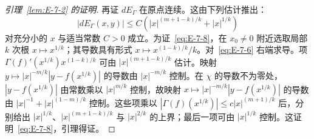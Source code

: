 \begin{proof}[引理~\ref{lem:E-7-2} 的证明]
再证 $dE_\Gamma$ 在原点连续。这由下列估计推出：
\begin{equation}\label{eq:E-7-8}
  |dE_\Gamma(x,y)|\le C\left(|x|^{(m+1-k)/k}+|x|^{1/k}\right)
\end{equation}
对充分小的 $x$ 与适当常数 $C>0$ 成立。为证~\eqref{eq:E-7-8}，在 $x_0\ne0$ 附近选取局部 $k$ 次根 $x\mapsto x^{1/k}$；其导数具有形式 $x\mapsto x^{(1-k)/k}/k$。对~\eqref{eq:E-7-6} 右端求导。项 $\Gamma(f)'(x^{1/k})x^{(1-k)/k}$ 可由 $|x|^{(m+1-k)/k}$ 估计。映射 $y\mapsto |x|^{-m/k}|y-f(x^{1/k})|$ 的导数由 $|x|^{-m/k}$ 控制。在 $\chi$ 的导数不为零处，$|y-f(x^{1/k})|$ 由常数乘以 $|x|^{m/k}$ 控制，故映射 $x\mapsto |x|^{-m/k}|y-f(x^{1/k})|$ 的导数由 $|x|^{-1}+|x|^{(1-m)/k}$ 控制。这些项乘以 $|\Gamma(f)(x^{1/k})|\le c|x|^{(m+1)/k}$ 后，分别给出 $|x|^{1/k}$、$|x|^{(m+1-k)/k}$ 与 $|x|^{2/k}$ 的上界；最后一项可由 $|x|^{1/k}$ 控制。这证明~\eqref{eq:E-7-8}，引理得证。
\end{proof}

